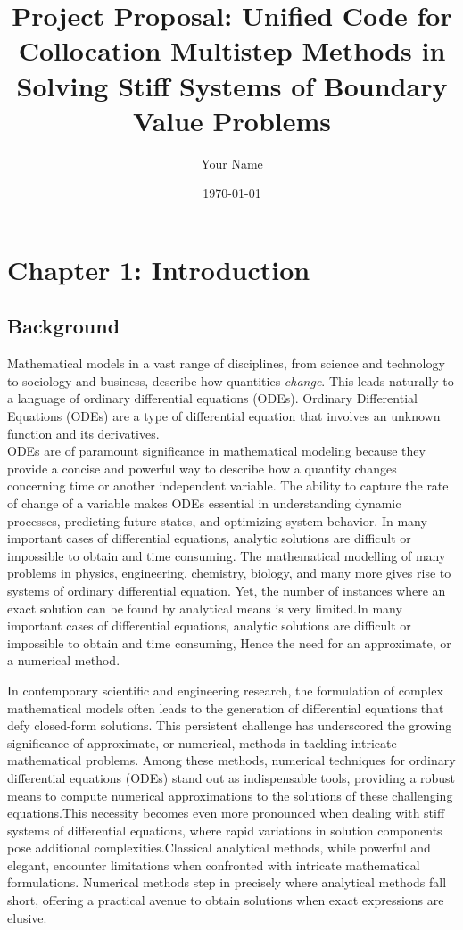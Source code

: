 \documentclass{report}
\title{Project Proposal: Unified Code for Collocation Multistep Methods in Solving Stiff Systems of Boundary Value Problems}
\author{Your Name}
\date{\today}
\begin{document}
\maketitle

\section{Chapter 1: Introduction}

\subsection{Background}
Mathematical models in a vast range of disciplines, from science and technology to sociology and business, describe how quantities \textsl{change}. This leads naturally to a language of ordinary differential equations (ODEs).
Ordinary Differential Equations (ODEs) are a type of differential equation that involves an unknown function and its derivatives. \\
ODEs are of paramount significance in mathematical modeling because they provide a concise and powerful way to describe how a quantity changes concerning time or another independent variable. The ability to capture the rate of change of a variable makes ODEs essential in understanding dynamic processes, predicting future states, and optimizing system behavior.
In many important cases of differential equations, analytic solutions are difficult or impossible to obtain and time
consuming.
The mathematical modelling of many problems in physics, engineering, chemistry, biology, and many more gives rise to systems of ordinary differential equation. Yet, the number of instances where an exact solution can be found by analytical means is very limited\cite{lambert1977}.In many important cases of differential equations, analytic solutions are difficult or impossible to obtain and time
consuming, Hence the need for an approximate, or a numerical method.

In contemporary scientific and engineering research, the formulation of complex mathematical models often leads to the generation of differential equations that defy closed-form solutions. This persistent challenge has underscored the growing significance of approximate, or numerical, methods in tackling intricate mathematical problems. Among these methods, numerical techniques for ordinary differential equations (ODEs) stand out as indispensable tools, providing a robust means to compute numerical approximations to the solutions of these challenging equations.This necessity becomes even more pronounced when dealing with stiff systems of differential equations, where rapid variations in solution components pose additional complexities.Classical analytical methods, while powerful and elegant, encounter limitations when confronted with intricate mathematical formulations. Numerical methods step in precisely where analytical methods fall short, offering a practical avenue to obtain solutions when exact expressions are elusive.
\end{document}
